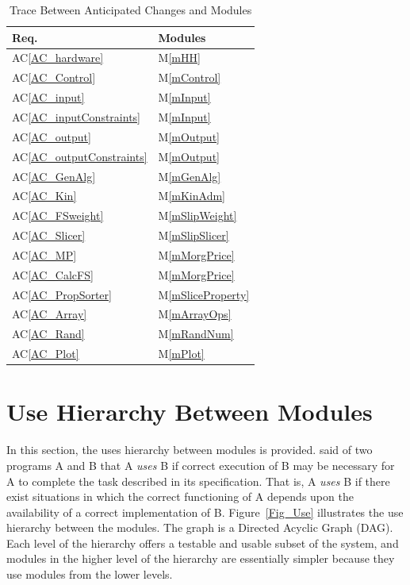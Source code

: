 \documentclass[12pt, titlepage]{article}
\newcommand{\acref}[1]{AC\ref{#1}}
\newcommand{\mref}[1]{M\ref{#1}}
\begin{document}
\begin{table}[h!]
\centering
\begin{tabular}{ll}
\toprule
\textbf{Req.} & \textbf{Modules}\\
\midrule
\acref{AC_hardware} & \mref{mHH}\\
\acref{AC_Control} & \mref{mControl}\\
\acref{AC_input} & \mref{mInput}\\
\acref{AC_inputConstraints} & \mref{mInput}\\
\acref{AC_output}& \mref{mOutput}\\
\acref{AC_outputConstraints}& \mref{mOutput}\\
\acref{AC_GenAlg}& \mref{mGenAlg}\\
\acref{AC_Kin}& \mref{mKinAdm}\\
\acref{AC_FSweight}& \mref{mSlipWeight}\\
\acref{AC_Slicer} & \mref{mSlipSlicer}\\
\acref{AC_MP} & \mref{mMorgPrice}\\
\acref{AC_CalcFS} & \mref{mMorgPrice}\\
\acref{AC_PropSorter}& \mref{mSliceProperty}\\
\acref{AC_Array} & \mref{mArrayOps}\\
\acref{AC_Rand} & \mref{mRandNum}\\
\acref{AC_Plot} & \mref{mPlot}\\
\bottomrule
\end{tabular}
\caption{Trace Between Anticipated Changes and Modules}
\label{Table:AC}
\end{table}

\section{Use Hierarchy Between Modules} \label{SecUse}

\hspace{3ex}In this section, the uses hierarchy between modules is
provided. \cite{Parnas1978} said of two programs A and B that A {\em
  uses} B if correct execution of B may be necessary for A to complete
the task described in its specification. That is, A {\em uses} B if
there exist situations in which the correct functioning of A depends
upon the availability of a correct implementation of B. 
Figure~\ref{Fig_Use} illustrates the use hierarchy between the modules. The
graph is a Directed Acyclic Graph (DAG). Each level of the hierarchy
offers a testable and usable subset of the system, and modules in the
higher level of the hierarchy are essentially simpler because they use
modules from the lower levels.
\end{document}

